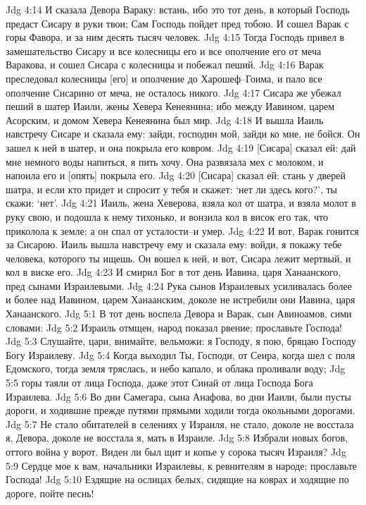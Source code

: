 Jdg 4:14  И сказала Девора Вараку: встань, ибо это тот день, в который Господь предаст Сисару в руки твои; Сам Господь пойдет пред тобою. И сошел Варак с горы Фавора, и за ним десять тысяч человек.
Jdg 4:15  Тогда Господь привел в замешательство Сисару и все колесницы его и все ополчение его от меча Варакова, и сошел Сисара с колесницы и побежал пеший.
Jdg 4:16  Варак преследовал колесницы [его] и ополчение до Харошеф--Гоима, и пало все ополчение Сисарино от меча, не осталось никого.
Jdg 4:17  Сисара же убежал пеший в шатер Иаили, жены Хевера Кенеянина; ибо между Иавином, царем Асорским, и домом Хевера Кенеянина был мир.
Jdg 4:18  И вышла Иаиль навстречу Сисаре и сказала ему: зайди, господин мой, зайди ко мне, не бойся. Он зашел к ней в шатер, и она покрыла его ковром.
Jdg 4:19  [Сисара] сказал ей: дай мне немного воды напиться, я пить хочу. Она развязала мех с молоком, и напоила его и [опять] покрыла его.
Jdg 4:20  [Сисара] сказал ей: стань у дверей шатра, и если кто придет и спросит у тебя и скажет: `нет ли здесь кого?', ты скажи: `нет'.
Jdg 4:21  Иаиль, жена Хеверова, взяла кол от шатра, и взяла молот в руку свою, и подошла к нему тихонько, и вонзила кол в висок его так, что приколола к земле; а он спал от усталости--и умер.
Jdg 4:22  И вот, Варак гонится за Сисарою. Иаиль вышла навстречу ему и сказала ему: войди, я покажу тебе человека, которого ты ищешь. Он вошел к ней, и вот, Сисара лежит мертвый, и кол в виске его.
Jdg 4:23  И смирил Бог в тот день Иавина, царя Ханаанского, пред сынами Израилевыми.
Jdg 4:24  Рука сынов Израилевых усиливалась более и более над Иавином, царем Ханаанским, доколе не истребили они Иавина, царя Ханаанского.
Jdg 5:1  В тот день воспела Девора и Варак, сын Авиноамов, сими словами:
Jdg 5:2  Израиль отмщен, народ показал рвение; прославьте Господа!
Jdg 5:3  Слушайте, цари, внимайте, вельможи: я Господу, я пою, бряцаю Господу Богу Израилеву.
Jdg 5:4  Когда выходил Ты, Господи, от Сеира, когда шел с поля Едомского, тогда земля тряслась, и небо капало, и облака проливали воду;
Jdg 5:5  горы таяли от лица Господа, даже этот Синай от лица Господа Бога Израилева.
Jdg 5:6  Во дни Самегара, сына Анафова, во дни Иаили, были пусты дороги, и ходившие прежде путями прямыми ходили тогда окольными дорогами.
Jdg 5:7  Не стало обитателей в селениях у Израиля, не стало, доколе не восстала я, Девора, доколе не восстала я, мать в Израиле.
Jdg 5:8  Избрали новых богов, оттого война у ворот. Виден ли был щит и копье у сорока тысяч Израиля?
Jdg 5:9  Сердце мое к вам, начальники Израилевы, к ревнителям в народе; прославьте Господа!
Jdg 5:10  Ездящие на ослицах белых, сидящие на коврах и ходящие по дороге, пойте песнь!
